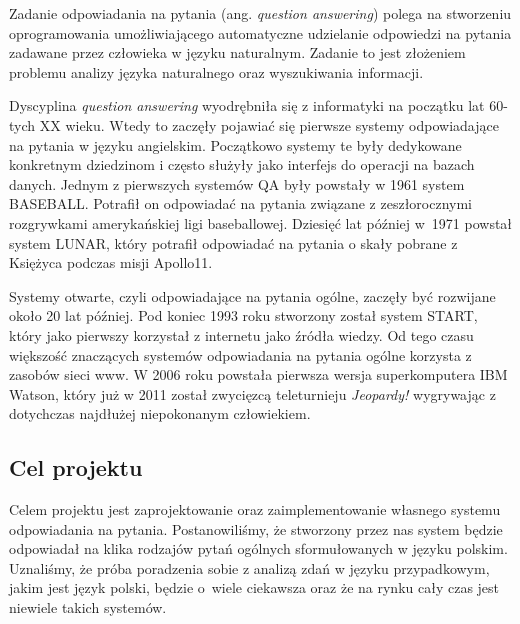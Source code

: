 

Zadanie odpowiadania na pytania (ang. \emph{question answering}) polega na stworzeniu oprogramowania umożliwiającego automatyczne udzielanie odpowiedzi na pytania zadawane przez człowieka w języku naturalnym. Zadanie to jest złożeniem problemu analizy języka naturalnego oraz wyszukiwania informacji.

Dyscyplina \emph{question answering} wyodrębniła się z informatyki na początku lat 60-tych XX wieku. Wtedy to zaczęły pojawiać się pierwsze systemy odpowiadające na pytania w języku angielskim. Początkowo systemy te były dedykowane konkretnym dziedzinom i często służyły jako interfejs do operacji na bazach danych. Jednym z pierwszych systemów QA były powstały w 1961 system BASEBALL. Potrafił on odpowiadać na pytania związane z zeszłorocznymi rozgrywkami amerykańskiej ligi baseballowej. Dziesięć lat później w~1971 powstał system LUNAR, który potrafił odpowiadać na pytania o skały pobrane z Księżyca podczas misji Apollo11. 

Systemy otwarte, czyli odpowiadające na pytania ogólne, zaczęły być rozwijane około 20 lat później. Pod koniec 1993 roku stworzony został system START, który jako pierwszy korzystał z internetu jako źródła wiedzy. Od tego czasu większość znaczących systemów odpowiadania na pytania ogólne korzysta z zasobów sieci www. W 2006 roku powstała pierwsza wersja superkomputera IBM Watson, który już w 2011 został zwycięzcą teleturnieju \emph{Jeopardy!} wygrywając z dotychczas najdłużej niepokonanym człowiekiem.

\subsection{Cel projektu}\label{subsec:wpr:cel}
Celem projektu jest zaprojektowanie oraz zaimplementowanie własnego systemu odpowiadania na pytania. Postanowiliśmy, że stworzony przez nas system będzie odpowiadał na klika rodzajów pytań ogólnych sformułowanych w języku polskim. Uznaliśmy, że próba poradzenia sobie z analizą zdań w języku przypadkowym, jakim jest język polski, będzie o~wiele ciekawsza oraz że na rynku cały czas jest niewiele takich systemów. 



